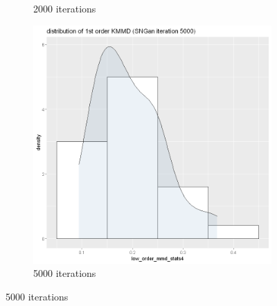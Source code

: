 \documentclass{article}
\begin{document}
\begin{figure}[h!]
\begin{subfigure}[b]{0.3\textwidth}
         \caption{2000 iterations}
     \end{subfigure}
     \hfill
     \begin{subfigure}[b]{0.3\textwidth}
         \centering
         \includegraphics[width=\textwidth]{kmmd_figures/sngan_face_lowdist_5000.png}
         \caption{5000 iterations}
     \end{subfigure}
\end{figure}
\end{document}

